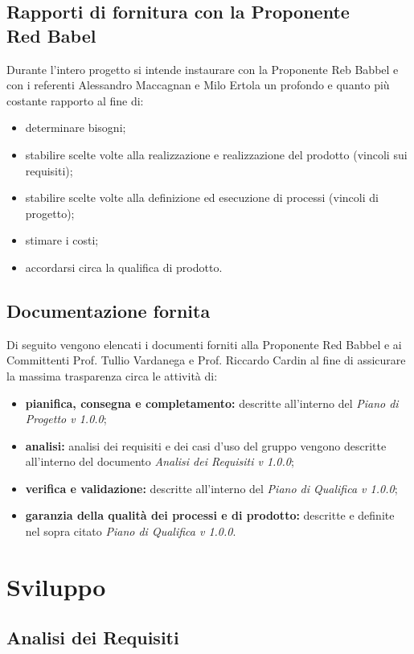 \documentclass[NormeDiProgetto.tex]{subfiles}
\begin{document}
\subsection[Rapporti di fornitura con la Proponente Red Babel]{Rapporti di fornitura con la Proponente \\ Red Babel}
Durante l'intero progetto si intende instaurare con la Proponente Reb Babbel e con i referenti Alessandro Maccagnan e Milo Ertola un profondo e quanto più costante rapporto al fine di:
\begin{itemize}
	\item determinare bisogni;
	\item stabilire scelte volte alla realizzazione e realizzazione del prodotto (vincoli sui requisiti);
	\item stabilire scelte volte alla definizione ed esecuzione di processi (vincoli di progetto);
	\item stimare i costi;
	\item accordarsi circa la qualifica di prodotto.
\end{itemize}
\subsection{Documentazione fornita}
Di seguito vengono elencati i documenti forniti alla Proponente Red Babbel e ai Committenti Prof. Tullio Vardanega e Prof. Riccardo Cardin al fine di assicurare la massima trasparenza circa le attività di:
\begin{itemize}
	\item \textbf{pianifica, consegna e completamento:} descritte all'interno del \textit{Piano di Progetto v 1.0.0};
	\item \textbf{analisi:} analisi dei requisiti e dei casi d'uso del gruppo vengono descritte all'interno del documento \textit{Analisi dei Requisiti v 1.0.0};
	\item \textbf{verifica e validazione:} descritte all'interno del \textit{Piano di Qualifica v	1.0.0};
	\item \textbf{garanzia della qualità dei processi e di prodotto:} descritte e definite nel sopra citato \textit{Piano di Qualifica v 1.0.0}.
\end{itemize}
\section{Sviluppo}
\subsection{Analisi dei Requisiti}
\end{document}
